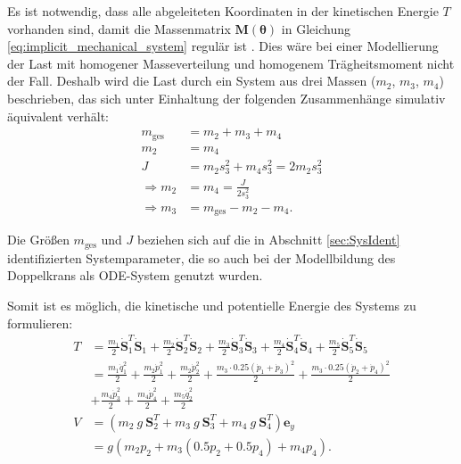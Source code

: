Es ist notwendig, dass alle abgeleiteten Koordinaten in der kinetischen Energie $T$ vorhanden sind, damit die Massenmatrix $\mathbf{M}(\boldsymbol{\theta})$ in Gleichung \eqref{eq:implicit_mechanical_system} regulär ist \cite[${\text{S. 7}}$]{DissKnoll}. Dies wäre bei einer Modellierung der Last mit homogener Masseverteilung und homogenem Trägheitsmoment nicht der Fall. Deshalb wird die Last durch ein System aus drei Massen ($m_2$, $m_3$, $m_4$) beschrieben, das sich unter Einhaltung der folgenden Zusammenhänge simulativ äquivalent verhält:
\begin{subequations}
\begin{align}
	m_{\mathrm{ges}} &= m_2 + m_3 + m_4\\
	m_2 &= m_4\\
	J &= m_2 s_3^2 + m_4 s_3^2 = 2 m_2 s_3^2\\
	\Rightarrow m_2 &= m_4 = \frac{J}{2 s_3^2} \\
	\Rightarrow m_3 &= m_{\mathrm{ges}} - m_2 -m_4.
\end{align}
\end{subequations}

Die Größen $m_{\mathrm{ges}}$ und $J$ beziehen sich auf die in Abschnitt \ref{sec:SysIdent} identifizierten Systemparameter, die so auch bei der Modellbildung des Doppelkrans als ODE-System genutzt wurden.

Somit ist es möglich, die kinetische und potentielle Energie des Systems zu formulieren:
\begin{align}
	T &= \frac{m_1}{2} \dot{\mathbf{S}}_1^T \dot{\mathbf{S}}_1 + \frac{m_2}{2} \dot{\mathbf{S}}_2^T \dot{\mathbf{S}}_2 + \frac{m_3}{2} \dot{\mathbf{S}}_3^T \dot{\mathbf{S}}_3 + \frac{m_4}{2} \dot{\mathbf{S}}_4^T \dot{\mathbf{S}}_4 + \frac{m_5}{2} \dot{\mathbf{S}}_5^T \dot{\mathbf{S}}_5 \nonumber \\  
	&= \frac{m_{1} \dot{q}_{1}^{2}}{2} + \frac{m_{2} \dot{p}_{1}^{2}}{2} + \frac{m_{2} \dot{p}_{2}^{2}}{2} + \frac{m_{3} \cdot 0.25 \left(\dot{p}_{1} + \dot{p}_{3}\right)^{2}}{2} + \frac{m_{3} \cdot 0.25 \left(\dot{p}_{2} + \dot{p}_{4}\right)^{2}}{2} \nonumber \\
	&+ \frac{m_{4} \dot{p}_{3}^{2}}{2} + \frac{m_{4} \dot{p}_{4}^{2}}{2} + \frac{m_{5} \dot{q}_{2}^{2}}{2} \\
	V &= (m_2 \ g \ \mathbf{S}_2^T + m_3 \ g \ \mathbf{S}_3^T + m_4 \ g \ \mathbf{S}_4^T) \mathbf{e}_y \nonumber \\ &= g \left(m_{2} p_{2} + m_{3} \left(0.5 p_{2} + 0.5 p_{4}\right) + m_{4} p_{4}\right).
\end{align}

